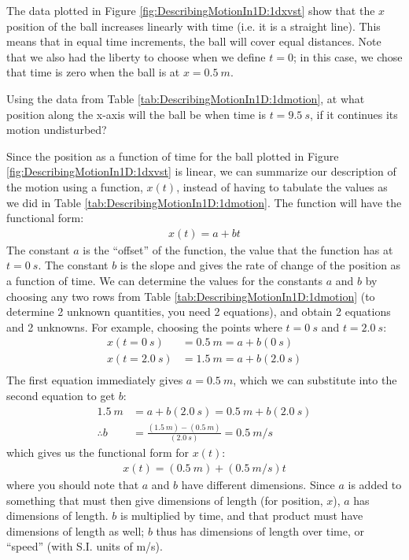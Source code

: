 The data plotted in Figure \ref{fig:DescribingMotionIn1D:1dxvst} show that the $x$ position of the ball increases linearly with time (i.e. it is a straight line). This means that in equal time increments, the ball will cover equal distances. Note that we also had the liberty to choose when we define $t=0$; in this case, we chose that time is zero when the ball is at $x=\SI{0.5}{m}$. 

\begin{checkpointSA}{Using the data from Table \ref{tab:DescribingMotionIn1D:1dmotion}, at what position along the x-axis will the ball be when time is $t=\SI{9.5}{s}$, if it continues its motion undisturbed?} %
\end{checkpointSA} 

Since the position as a function of time for the ball plotted in Figure \ref{fig:DescribingMotionIn1D:1dxvst} is linear, we can summarize our description of the motion using a function, $x(t)$, instead of having to tabulate the values as we did in Table \ref{tab:DescribingMotionIn1D:1dmotion}. The function will have the functional form:
\begin{align*}
x(t) = a + b t
\end{align*}
The constant $a$ is the ``offset'' of the function, the value that the function has at $t=\SI{0}{s}$. The constant $b$ is the slope and gives the rate of change of the position as a function of time. We can determine the values for the constants $a$ and $b$ by choosing any two rows from Table \ref{tab:DescribingMotionIn1D:1dmotion} (to determine 2 unknown quantities, you need 2 equations), and obtain 2 equations and 2 unknowns. For example, choosing the points where $t=\SI{0}{s}$ and $t=\SI{2.0}{s}$:
\begin{align*}
x(t=\SI{0}{s})&=\SI{0.5}{m}=a + b(\SI{0}{s}) \\
x(t=\SI{2.0}{s})&=\SI{1.5}{m}=a + b(\SI{2.0}{s}) \\
\end{align*}
The first equation immediately gives $a = \SI{0.5}{m}$, which we can substitute into the second equation to get $b$:
\begin{align*}
\SI{1.5}{m}&=a + b(\SI{2.0}{s}) = \SI{0.5}{m} + b(\SI{2.0}{s})\\
\therefore b &=\frac{(\SI{1.5}{m})-(\SI{0.5}{m})}{(\SI{2.0}{s})}=\SI{0.5}{m/s}
\end{align*}
which gives us the functional form for $x(t)$:
\begin{align*}
x(t) = (\SI{0.5}{m}) + (\SI{0.5}{m/s}) t
\end{align*}
where you should note that $a$ and $b$ have different dimensions. Since $a$ is added to something that must then give dimensions of length (for position, $x$), $a$ has dimensions of length. $b$ is multiplied by time, and that product must have dimensions of length as well; $b$ thus has dimensions of length over time, or ``speed'' (with S.I. units of \si{m/s}).

